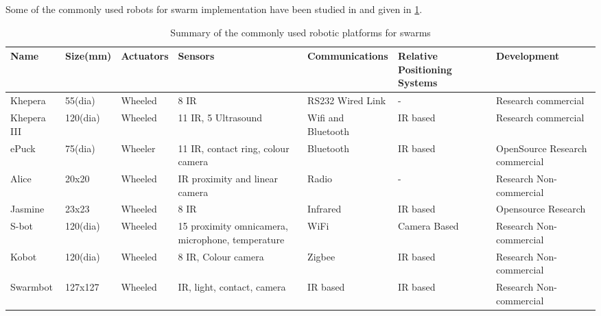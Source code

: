 \begin{spacing}{2}
Some of the commonly used robots for swarm implementation have been studied in \cite{navarro2012introduction} and given in \ref{tab:swarmrobots}.
\end{spacing}
\begin{spacing}{1}
\begin{table}
    \centering
    \caption{Summary of the commonly used robotic platforms for swarms}
    \begin{tabular}{p{2cm} p{2cm} p{2cm} p{4cm} p{3cm} p{3.5cm} p{4cm}}
        \hline Name & Size(mm) & Actuators & Sensors & Communications & Relative Positioning Systems & Development \\ 
        \hline 
        Khepera & 55(dia) & Wheeled & 8 IR & RS232 Wired Link & - & Research commercial \\
        Khepera III & 120(dia) & Wheeled & 11 IR, 5 Ultrasound & Wifi and Bluetooth & IR based & Research commercial \\
        ePuck & 75(dia) & Wheeler & 11 IR, contact ring, colour camera & Bluetooth & IR based & OpenSource Research commercial \\
        Alice & 20x20 & Wheeled & IR proximity and linear camera & Radio & - & Research Non-commercial \\
        Jasmine & 23x23 & Wheeled & 8 IR & Infrared & IR based & Opensource Research \\
        S-bot & 120(dia) & Wheeled & 15 proximity omnicamera, microphone, temperature & WiFi & Camera Based & Research Non-commercial \\
        Kobot & 120(dia) & Wheeled & 8 IR, Colour camera& Zigbee & IR based & Research Non-commercial \\
        Swarmbot & 127x127 & Wheeled & IR, light, contact, camera & IR based & IR based & Research Non-commercial
        \\\hline
    \end{tabular}
        
    
    \label{tab:swarmrobots}
\end{table}

\end{spacing}